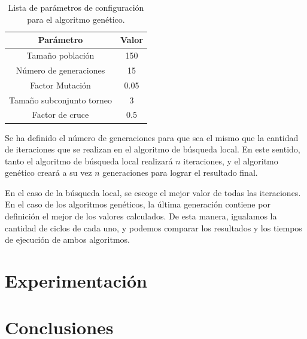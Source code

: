 \documentclass[10pt,a4paper]{article}
\begin{document}
\begin{table}
\begin{center}
\begin{tabular}{|c||c|}
\hline
Parámetro & Valor \\
\hline \hline
Tamaño población & 150 \\
\hline
Número de generaciones & 15 \\
\hline
Factor Mutación & 0.05\\
\hline
Tamaño subconjunto torneo & 3\\
\hline
Factor de cruce & 0.5 \\
\hline
\end{tabular}
\end{center}
\caption{Lista de parámetros de configuración para el algoritmo genético.}
\label{tab:gaParameters}
\end{table}

Se ha definido el número de generaciones para que sea el mismo que la cantidad de iteraciones que se realizan en el algoritmo de búsqueda local. En este sentido, tanto el algoritmo de búsqueda local realizará $n$ iteraciones, y el algoritmo genético creará a su vez $n$ generaciones para lograr el resultado final. 

En el caso de la búsqueda local, se escoge el mejor valor de todas las iteraciones. En el caso de los algoritmos genéticos, la última generación contiene por definición el mejor de los valores calculados. De esta manera, igualamos la cantidad de ciclos de cada uno, y podemos comparar los resultados y los tiempos de ejecución de ambos algoritmos.

\section{Experimentación}


\section{Conclusiones}


{}

\end{document}
